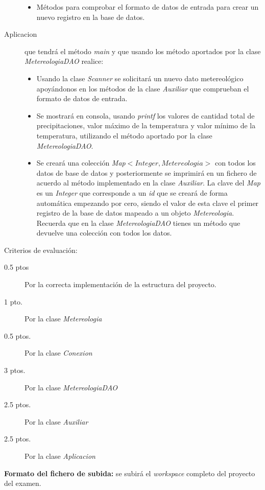 \documentclass[addpoints,12pt]{exam}
\begin{document}
\begin{questions}
\begin{description}
\begin{itemize}
\item Métodos para comprobar el formato de datos de entrada para crear un nuevo registro en la base de datos.
\end{itemize}
\item[Aplicacion] que tendrá el método \emph{main} y que usando los método aportados por la clase  \emph{MetereologiaDAO} realice:
\begin{itemize}
\item Usando la clase \emph{Scanner} se solicitará un nuevo dato metereológico apoyándonos en los métodos de la clase \emph{Auxiliar} que comprueban el formato de datos de entrada.
\item Se mostrará en consola, usando \emph{printf} los valores de cantidad total de precipitaciones, valor máximo de la temperatura y valor mínimo de la temperatura, utilizando el método aportado por la clase \emph{MetereologiaDAO}.
\item Se creará una colección \emph{Map$<Integer,Metereologia>$} con todos los datos de base de datos y posteriormente se imprimirá en un fichero de acuerdo al método implementado en la clase \emph{Auxiliar}. La clave del \emph{Map} es un \emph{Integer} que corresponde a un \emph{id} que se creará de forma automática empezando por cero, siendo el valor de esta clave el primer registro de la base de datos mapeado a un objeto \emph{Metereologia}. Recuerda que en la clase \emph{MetereologiaDAO} tienes un método que devuelve una colección con todos los datos. 
\end{itemize}
\end{description}
Criterios de evaluación:
\begin{description}
\item[0.5 ptos] Por la correcta implementación de la estructura del proyecto.
\item[1 pto.] Por la clase \emph{Metereologia}
\item[0.5 ptos.] Por la clase \emph{Conexion}
\item[3 ptos.] Por la clase \emph{MetereologiaDAO}
\item[2.5 ptos.] Por la clase \emph{Auxiliar}
\item[2.5 ptos.] Por la clase \emph{Aplicacion}
\end{description}
\textbf{Formato del fichero de subida:} se subirá el \emph{workspace} completo del proyecto del examen.
\end{questions}
\end{document}
